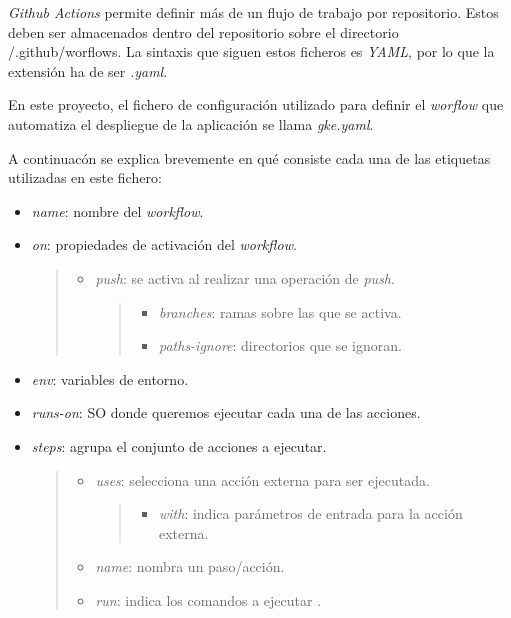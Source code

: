 \emph{Github Actions} permite definir más de un flujo de trabajo por
repositorio. Estos deben ser almacenados dentro del repositorio sobre el
directorio {/.github/worflows}. La sintaxis que siguen estos ficheros es
\emph{YAML}, por lo que la extensión ha de ser \emph{.yaml}.

En este proyecto, el fichero de configuración utilizado para definir el
\emph{worflow} que automatiza el despliegue de la aplicación se llama
\emph{gke.yaml}.

A continuacón se explica brevemente en qué consiste cada una de las
etiquetas utilizadas en este fichero:

\begin{itemize}
\tightlist
\item
  \emph{name}: nombre del \emph{workflow}.
\item
  \emph{on}: propiedades de activación del \emph{workflow}.

  \begin{quote}
  \begin{itemize}
  \item
    \emph{push}: se activa al realizar una operación de \emph{push}.

    \begin{quote}
    \begin{itemize}
    \tightlist
    \item
      \emph{branches}: ramas sobre las que se activa.
    \item
      \emph{paths-ignore}: directorios que se ignoran.
    \end{itemize}
    \end{quote}
  \end{itemize}
  \end{quote}
\item
  \emph{env}: variables de entorno.
\item
  \emph{runs-on}: SO donde queremos ejecutar cada una de las acciones.
\item
  \emph{steps}: agrupa el conjunto de acciones a ejecutar.

  \begin{quote}
  \begin{itemize}
  \item
    \emph{uses}: selecciona una acción externa para ser ejecutada.

    \begin{quote}
    \begin{itemize}
    \tightlist
    \item
      \emph{with}: indica parámetros de entrada para la acción externa.
    \end{itemize}
    \end{quote}
  \item
    \emph{name}: nombra un paso/acción.
  \item
    \emph{run}: indica los comandos a ejecutar .
  \end{itemize}
  \end{quote}
\end{itemize}

